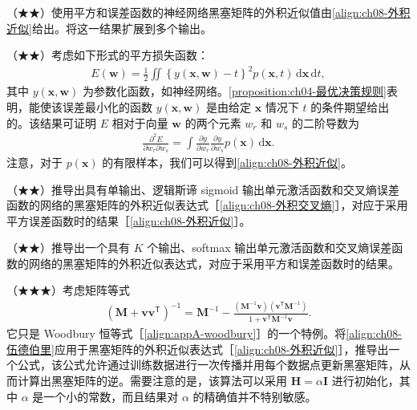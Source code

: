 \documentclass[../../main.tex]{subfiles}
\begin{document}
\begin{exercise}\label{exercise:ch08-08}
（★★）使用平方和误差函数的神经网络黑塞矩阵的外积近似值由\eqref{align:ch08-外积近似}给出。将这一结果扩展到多个输出。
\end{exercise}

\begin{exercise}\label{exercise:ch08-09}
（★★）考虑如下形式的平方损失函数：
\begin{align}
E(\mathbf{w})=\frac{1}{2}\iint\left\{y(\mathbf{x},\mathbf{w})-t\right\}^{2}p(\mathbf{x},t)\,\mathrm{d}\mathbf{x}\,\mathrm{d}t,
\label{align:ch08-习题平方损失}
\end{align}
其中 $y(\mathbf{x},\mathbf{w})$ 为参数化函数，如神经网络。\cref{proposition:ch04-最优决策规则}表明，能使该误差最小化的函数 $y(\mathbf{x},\mathbf{w})$ 是由给定 $\mathbf{x}$ 情况下 $t$ 的条件期望给出的。该结果可证明 $E$ 相对于向量 $\mathbf{w}$ 的两个元素 $w_r$ 和 $w_s$ 的二阶导数为
\begin{align}
\frac{\partial^{2}E}{\partial w_r\partial w_s}=\int\frac{\partial y}{\partial w_r}\frac{\partial y}{\partial w_s}p(\mathbf{x})\,\mathrm{d}\mathbf{x}.
\label{align:ch08-习题平方损失二阶}
\end{align}
注意，对于 $p(\mathbf{x})$ 的有限样本，我们可以得到\eqref{align:ch08-外积近似}。
\end{exercise}

\begin{exercise}\label{exercise:ch08-10}
（★★）推导出具有单输出、逻辑斯谛 sigmoid 输出单元激活函数和交叉熵误差函数的网络的黑塞矩阵的外积近似表达式［\eqref{align:ch08-外积交叉熵}］，对应于采用平方误差函数时的结果［\eqref{align:ch08-外积近似}］。
\end{exercise}

\begin{exercise}\label{exercise:ch08-11}
（★★）推导出一个具有 $K$ 个输出、softmax 输出单元激活函数和交叉熵误差函数的网络的黑塞矩阵的外积近似表达式，对应于采用平方和误差函数时的结果。
\end{exercise}

\begin{exercise}\label{exercise:ch08-12}
（★★★）考虑矩阵等式
\begin{align}
\left(\mathbf{M}+\mathbf{v}\mathbf{v}^{\mathsf T}\right)^{-1}
=\mathbf{M}^{-1}-\frac{\left(\mathbf{M}^{-1}\mathbf{v}\right)\left(\mathbf{v}^{\mathsf T}\mathbf{M}^{-1}\right)}{1+\mathbf{v}^{\mathsf T}\mathbf{M}^{-1}\mathbf{v}}.
\label{align:ch08-伍德伯里}
\end{align}
它只是 Woodbury 恒等式［\eqref{align:appA-woodbury}］的一个特例。将\eqref{align:ch08-伍德伯里}应用于黑塞矩阵的外积近似表达式［\eqref{align:ch08-外积近似}］，推导出一个公式，该公式允许通过训练数据进行一次传播并用每个数据点更新黑塞矩阵，从而计算出黑塞矩阵的逆。需要注意的是，该算法可以采用 $\mathbf{H}=\alpha\mathbf{I}$ 进行初始化，其中 $\alpha$ 是一个小的常数，而且结果对 $\alpha$ 的精确值并不特别敏感。
\end{exercise}
\end{document}
